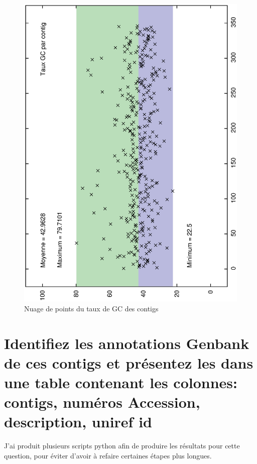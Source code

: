 \documentclass[10.9pt]{article} %
\begin{document}
\begin{figure}[p]
\includegraphics[scale=0.6,angle=270]{contigs_taux.eps}
\caption{Nuage de points du taux de GC des contigs}
\end{figure}





\newpage
\section{Identifiez les annotations Genbank de ces contigs et présentez les dans une table contenant
les colonnes: contigs, numéros Accession, description, uniref id} %

J'ai produit plusieurs scripts python afin de produire les résultats pour cette question, pour éviter
d'avoir à refaire certaines étapes plus longues.
\end{document}
